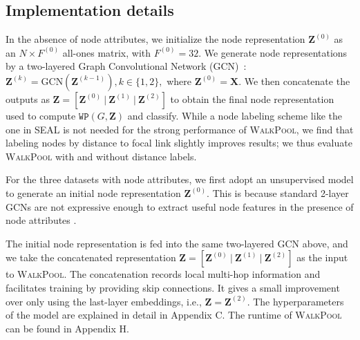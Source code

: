 \documentclass[11pt]{article}
\newcommand{\walkpool}{\textsc{WalkPool}\xspace}
\newcommand{\UPDATE}[1]{\textcolor{WowColor}{{#1}}}
\renewcommand{\UPDATE}[1]{#1}
\begin{document}
\subsection{Implementation details}
\vspace{-1mm}
In the absence of node attributes, we initialize the node representation $\mathbf{Z}^{(0)}$ as an $N\times F^{(0)}$ all-ones matrix, with $F^{(0)} =32$. We generate node representations by a two-layered Graph Convolutional Network (GCN)~\citep{kipf2016semi}:
$
\mathbf{Z}^{(k)} = \mathrm{GCN}\left(\mathbf{Z}^{(k-1)}\right),  k\in \{1,2\},
$
where $\mathbf{Z}^{(0)}=\mathbf{X}$. We then concatenate the outputs as $\mathbf{Z} = [\mathbf{Z}^{(0)} \ \vert \ \mathbf{Z}^{(1)} \ \vert \ \mathbf{Z}^{(2)}]$ to obtain the final node representation used to compute $\mathtt{WP}(G,\mathbf{Z})$ and classify. While a node labeling scheme like the one in SEAL is not needed for the strong performance of \walkpool, we find that labeling nodes by distance to focal link slightly improves results; we thus evaluate \walkpool with and without distance labels.

For the three datasets with node attributes, we first adopt an unsupervised model to generate an initial node representation $\mathbf{Z}^{(0)}$. This is because standard 2-layer GCNs are not expressive enough to extract useful node features in the presence of node attributes \citet{zhang2019graph}.



The initial node representation is fed into the same two-layered GCN above, and we take the concatenated representation $\mathbf{Z} = [\mathbf{Z}^{(0)}\ \vert\  \mathbf{Z}^{(1)}\ \vert \ \mathbf{Z}^{(2)}]$ as the input to \walkpool. \UPDATE{The concatenation records local multi-hop information and facilitates training by providing skip connections. It gives a small improvement over only using the last-layer embeddings, i.e., $\mathbf{Z}=\mathbf{Z}^{(2)}$.} The hyperparameters of the model are explained in detail in Appendix C. \UPDATE{The runtime of \walkpool can be found in Appendix H.}
\vspace{-1mm}
\end{document}
